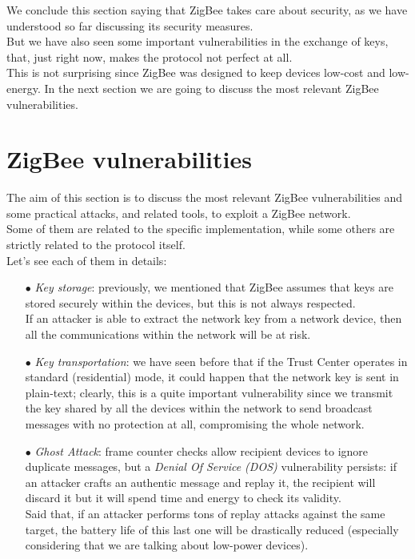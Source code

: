 \documentclass[12pt]{report}
\begin{document}
{\begin{itemize}
\end{itemize}


We conclude this section saying that ZigBee takes care about security, as we have understood so far discussing its security measures.\\
But we have also seen some important vulnerabilities in the exchange of keys, that, just right now, makes the protocol not perfect at all.\\
This is not surprising since ZigBee was designed to keep devices low-cost and low-energy.
In the next section we are going to discuss the most relevant ZigBee vulnerabilities.


\clearpage
\section{ZigBee vulnerabilities}
\bigskip
The aim of this section is to discuss the most relevant ZigBee vulnerabilities and some practical attacks, and related tools, to exploit a ZigBee network.\\
Some of them are related to the specific implementation, while some others are strictly related to the protocol itself.\\
Let's see each of them in details:

\begin{itemize}
\setlength{\itemindent}{+4mm}
\item[$\bullet$] \emph{Key storage}: previously, we mentioned that ZigBee assumes that keys are stored securely within the devices, but this is not always respected.\\
If an attacker is able to extract the network key from a network device, then all the communications within the network will be at risk.

\item[$\bullet$] \emph{Key transportation}: we have seen before that if the Trust Center operates in standard (residential) mode, it could happen that the network key is sent in plain-text; clearly, this is a quite important vulnerability since we transmit the key shared by all the devices within the network to send broadcast messages with no protection at all, compromising the whole network.

\item[$\bullet$] \emph{Ghost Attack}: frame counter checks allow recipient devices to ignore duplicate messages, but a \emph{Denial Of Service (DOS)} vulnerability persists: if an attacker crafts an authentic message and replay it, the recipient will discard it but it will spend time and energy to check its validity.\\
Said that, if an attacker performs tons of replay attacks against the same target, the battery life of this last one will be drastically reduced (especially considering that we are talking about low-power devices).


\end{itemize}}
\end{document}
